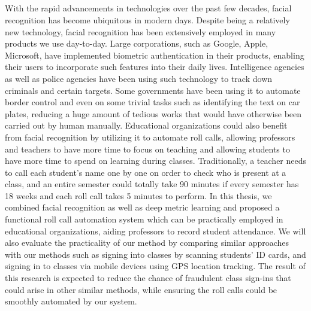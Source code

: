 \begin{center}
  \section*{\abstractname}
\end{center}
\large

With the rapid advancements in technologies over the past few decades, facial recognition has become
ubiquitous in modern days. Despite being a relatively new technology, facial recognition has been
extensively employed in many products we use day-to-day. Large corporations, such as Google, Apple, Microsoft, 
have implemented biometric authentication in their products, enabling their users to incorporate
such features into their daily lives. Intelligence agencies as well as police agencies have been using
such technology to track down criminals and certain targets. Some governments have been using it to automate
border control and even on some trivial tasks such as identifying the text on car plates, reducing a huge amount
of tedious works that would have otherwise been carried out by human manually. Educational organizations
could also benefit from facial recognition by utilizing it to automate roll calls, allowing professors and teachers
to have more time to focus on teaching and allowing students to have more time to spend on learning during classes.
Traditionally, a teacher needs to call each student's name one by one on order to check who is present at a class,
and an entire semester could totally take 90 minutes if every semester has 18 weeks and each roll call takes
5 minutes to perform. In this thesis, we combined facial recognition as well as deep metric learning and proposed
a functional roll call automation system which can be practically employed in educational organizations, 
aiding professors to record student attendance. We will also evaluate the practicality of our method by comparing
similar approaches with our methods such as signing into classes by scanning students' ID cards, and
signing in to classes via mobile devices using GPS location tracking. The result of this research is expected to
reduce the chance of fraudulent class sign-ins that could arise in other similar methods, while ensuring the roll calls
could be smoothly automated by our system.
\newpage
